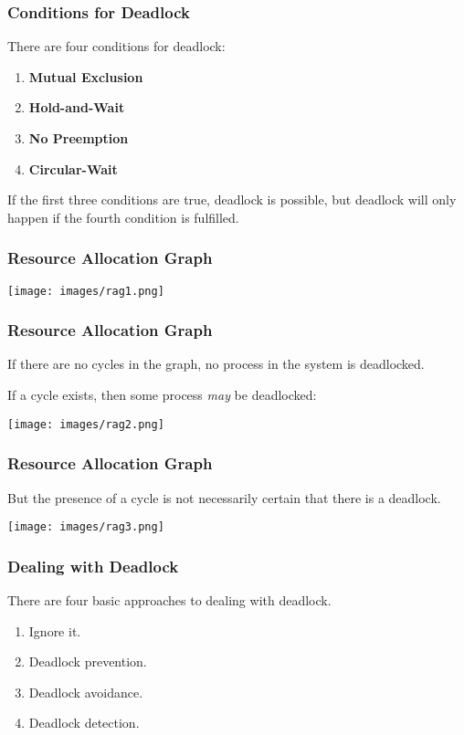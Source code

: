 \begin{frame}
\frametitle{Conditions for Deadlock}
There are four conditions for deadlock:

\begin{enumerate}
	\item \textbf{Mutual Exclusion}
	\item \textbf{Hold-and-Wait}
	\item \textbf{No Preemption}
	\item \textbf{Circular-Wait}
\end{enumerate}


If the first three conditions are true, deadlock is possible, but deadlock will only happen if the fourth condition is fulfilled. 


\end{frame}

\begin{frame}
\frametitle{Resource Allocation Graph}

\begin{center}
\texttt{[image: images/rag1.png]}
\end{center}

\end{frame}

\begin{frame}
\frametitle{Resource Allocation Graph}

If there are no cycles in the graph, no process in the system is deadlocked. 

If a cycle exists, then some process \textit{may} be deadlocked:

\begin{center}
\texttt{[image: images/rag2.png]}
\end{center}

\end{frame}

\begin{frame}
\frametitle{Resource Allocation Graph}

But the presence of a cycle is not necessarily certain that there is a deadlock.

\begin{center}
\texttt{[image: images/rag3.png]}
\end{center}


\end{frame}

\begin{frame}
\frametitle{Dealing with Deadlock}

There are four basic approaches to dealing with deadlock.

\begin{enumerate}
	\item Ignore it.
	\item Deadlock prevention.
	\item Deadlock avoidance.
	\item Deadlock detection.
\end{enumerate}

\end{frame}

